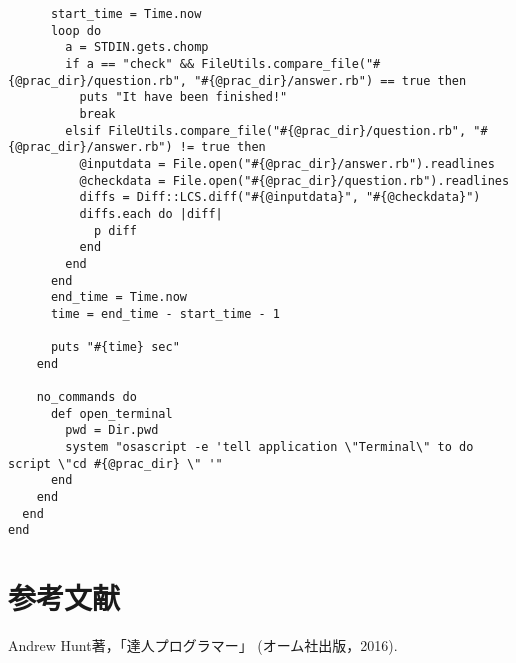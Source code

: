 \begin{verbatim}
      start_time = Time.now
      loop do
        a = STDIN.gets.chomp
        if a == "check" && FileUtils.compare_file("#{@prac_dir}/question.rb", "#{@prac_dir}/answer.rb") == true then
          puts "It have been finished!"
          break
        elsif FileUtils.compare_file("#{@prac_dir}/question.rb", "#{@prac_dir}/answer.rb") != true then
          @inputdata = File.open("#{@prac_dir}/answer.rb").readlines
          @checkdata = File.open("#{@prac_dir}/question.rb").readlines
          diffs = Diff::LCS.diff("#{@inputdata}", "#{@checkdata}")
          diffs.each do |diff|
            p diff
          end
        end
      end
      end_time = Time.now
      time = end_time - start_time - 1
      
      puts "#{time} sec"
    end
    
    no_commands do
      def open_terminal
        pwd = Dir.pwd
        system "osascript -e 'tell application \"Terminal\" to do script \"cd #{@prac_dir} \" '"
      end
    end
  end
end
\end{verbatim}

    \section{参考文献}\label{ux53c2ux8003ux6587ux732e}

    Andrew Hunt著，「達人プログラマー」 (オーム社出版，2016).

    